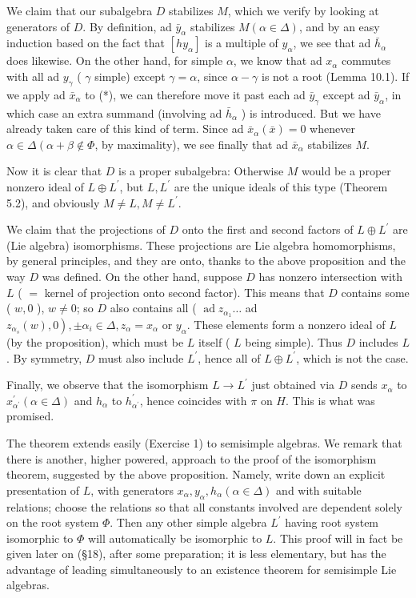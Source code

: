 \documentclass[10pt]{article}
\begin{document}
We claim that our subalgebra $D$ stabilizes $M$, which we verify by looking at generators of $D$. By definition, ad $\bar{y}_{\alpha}$ stabilizes $M(\alpha \in \Delta)$, and by an easy induction based on the fact that $\left[h y_{\alpha}\right]$ is a multiple of $y_{\alpha}$, we see that ad $\bar{h}_{\alpha}$ does likewise. On the other hand, for simple $\alpha$, we know that ad $x_{\alpha}$ commutes with all ad $y_{\gamma}$ ( $\gamma$ simple) except $\gamma=\alpha$, since $\alpha-\gamma$ is not a root (Lemma 10.1). If we apply ad $\bar{x}_{\alpha}$ to (*), we can therefore move it past each ad $\bar{y}_{\gamma}$ except ad $\bar{y}_{\alpha}$, in which case an extra summand (involving ad $\bar{h}_{\alpha}$ ) is introduced. But we have already taken care of this kind of term. Since ad $\bar{x}_{\alpha}(\bar{x})=0$ whenever $\alpha \in \Delta\left(\alpha+\beta \notin \Phi\right.$, by maximality), we see finally that ad $\bar{x}_{\alpha}$ stabilizes $M$.

Now it is clear that $D$ is a proper subalgebra: Otherwise $M$ would be a proper nonzero ideal of $L \oplus L^{\prime}$, but $L, L^{\prime}$ are the unique ideals of this type (Theorem 5.2), and obviously $M \neq L, M \neq L^{\prime}$.

We claim that the projections of $D$ onto the first and second factors of $L \oplus L^{\prime}$ are (Lie algebra) isomorphisms. These projections are Lie algebra homomorphisms, by general principles, and they are onto, thanks to the above proposition and the way $D$ was defined. On the other hand, suppose $D$ has nonzero intersection with $L$ ( $=$ kernel of projection onto second factor). This means that $D$ contains some ( $w, 0$ ), $w \neq 0$; so $D$ also contains all ( $\operatorname{ad} z_{\alpha_{1}} \ldots$ ad $\left.z_{\alpha_{s}}(w), 0\right), \pm \alpha_{i} \in \Delta, z_{\alpha}=x_{\alpha}$ or $y_{\alpha}$. These elements form a nonzero ideal of $L$ (by the proposition), which must be $L$ itself ( $L$ being simple). Thus $D$ includes $L$. By symmetry, $D$ must also include $L^{\prime}$, hence all of $L \oplus L^{\prime}$, which is not the case.

Finally, we observe that the isomorphism $L \rightarrow L^{\prime}$ just obtained via $D$ sends $x_{\alpha}$ to $x_{\alpha^{\prime}}^{\prime}(\alpha \in \Delta)$ and $h_{\alpha}$ to $h_{\alpha^{\prime}}^{\prime}$, hence coincides with $\pi$ on $H$. This is what was promised.

The theorem extends easily (Exercise 1) to semisimple algebras. We remark that there is another, higher powered, approach to the proof of the isomorphism theorem, suggested by the above proposition. Namely, write down an explicit presentation of $L$, with generators $x_{\alpha}, y_{\alpha}, h_{\alpha}(\alpha \in \Delta)$ and with suitable relations; choose the relations so that all constants involved are dependent solely on the root system $\Phi$. Then any other simple algebra $L^{\prime}$ having root system isomorphic to $\Phi$ will automatically be isomorphic to $L$. This proof will in fact be given later on (§18), after some preparation; it is less elementary, but has the advantage of leading simultaneously to an existence theorem for semisimple Lie algebras.
\end{document}
